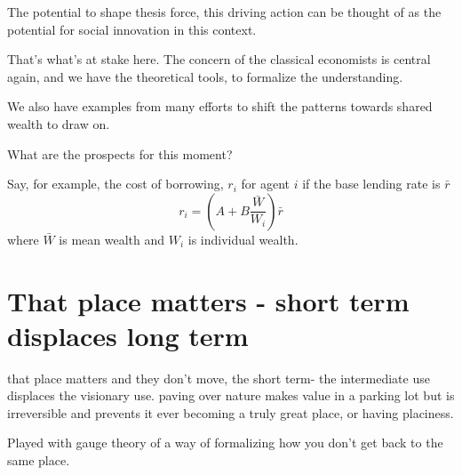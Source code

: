 
The potential to shape thesis force, this driving action can be thought of as the potential for social innovation in this context.


That's what's at stake here.
The concern of the classical economists is central again, and we have the theoretical tools, to formalize the understanding.

We also have examples from many efforts to shift the patterns towards shared wealth to draw on. 

What are the prospects for this moment?

Say, for example, the cost of borrowing, $r_i$ for agent $i$ if the base lending rate is $\bar{r}$
\[ r_i = (A + B \frac{\bar{W}}{W_i})\bar r\]
where $\bar{W}$ is mean wealth and $W_i$ is individual wealth. %


\section{That place matters - short term displaces long term}
that place matters and they don't move, the short term- the intermediate use displaces the visionary use. 
paving over nature makes value in a parking lot but is irreversible and prevents it ever becoming a truly great place, or having placiness.

Played with gauge theory of a way of formalizing how you don't get back to the same place. 